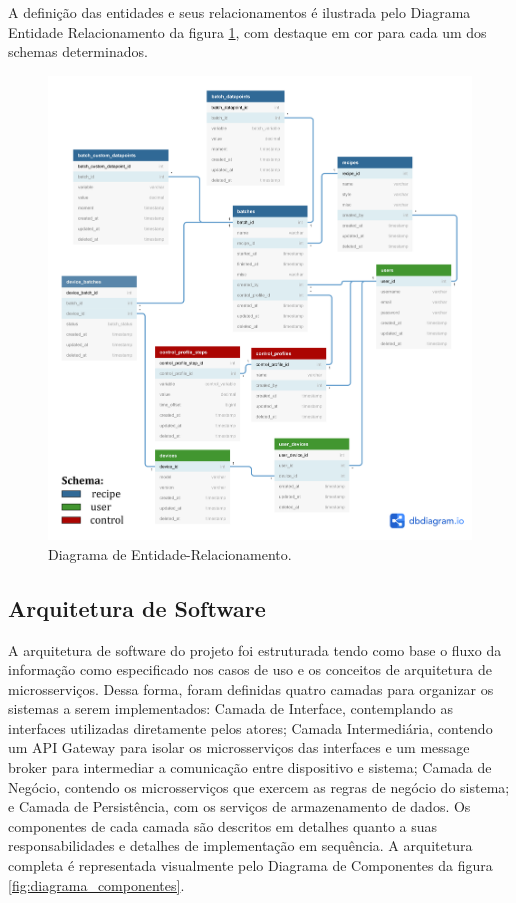 A definição das entidades e seus relacionamentos é ilustrada pelo Diagrama Entidade Relacionamento da figura \ref{fig:diagrama_entidade_relacionamento}, com destaque em cor para cada um dos schemas determinados.

\begin{figure}[H]
    \centering
    \includegraphics[scale=0.16]{figuras/projeto/software/banco_de_dados.png}
    \caption{Diagrama de Entidade-Relacionamento.}
    \label{fig:diagrama_entidade_relacionamento}
\end{figure}

\subsection{Arquitetura de Software}

A arquitetura de software do projeto foi estruturada tendo como base o fluxo da informação como especificado nos casos de uso e os conceitos de arquitetura de microsserviços. Dessa forma, foram definidas quatro camadas para organizar os sistemas a serem implementados: Camada de Interface, contemplando as interfaces utilizadas diretamente pelos atores; Camada Intermediária, contendo um API Gateway para isolar os microsserviços das interfaces e um message broker para intermediar a comunicação entre dispositivo e sistema; Camada de Negócio, contendo os microsserviços que exercem as regras de negócio do sistema; e Camada de Persistência, com os serviços de armazenamento de dados. Os componentes de cada camada são descritos em detalhes quanto a suas responsabilidades e detalhes de implementação em sequência. A arquitetura completa é representada visualmente pelo Diagrama de Componentes da figura \ref{fig:diagrama_componentes}.

